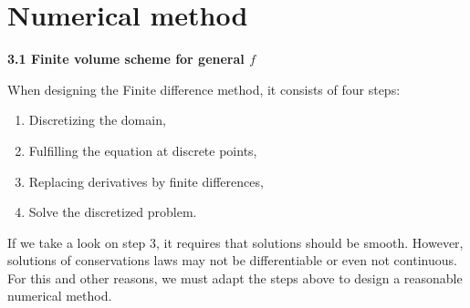 \section{Numerical method}
\begin{center}
    {\bfseries 3.1 Finite volume scheme for general $f$}
\end{center}
When designing the Finite difference method, it consists of four steps:
\begin{enumerate}
    \item Discretizing the domain,
    \item Fulfilling the equation at discrete points,
    \item Replacing derivatives by finite differences,
    \item Solve the discretized problem.
\end{enumerate}

If we take a look on step 3, it requires that solutions should be smooth. However, solutions of conservations laws
may not be differentiable or even not continuous. For this and other reasons, we must adapt the steps above to design
a reasonable numerical method.